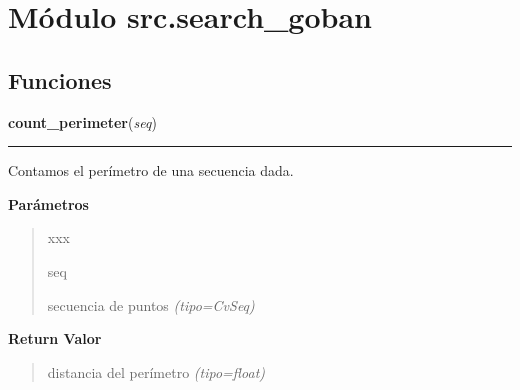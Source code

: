 %
%
%


\section{Módulo src.search\_goban}

    \label{src:search_goban}


  \subsection{Funciones}

    \label{src:search_goban:count_perimeter}

    \vspace{0.5ex}

\hspace{.8\funcindent}\begin{boxedminipage}{\funcwidth}

    \raggedright \textbf{count\_perimeter}(\textit{seq})

    \vspace{-1.5ex}

    \rule{\textwidth}{0.5\fboxrule}
\setlength{\parskip}{2ex}
Contamos el perímetro de una secuencia dada.

\setlength{\parskip}{1ex}
      \textbf{Parámetros}
      \vspace{-1ex}

      \begin{quote}
        \begin{Ventry}{xxx}

          \item[seq]


secuencia de puntos
            {\it (tipo=CvSeq)}

        \end{Ventry}

      \end{quote}

      \textbf{Return Valor}
    \vspace{-1ex}

      \begin{quote}

distancia del perímetro
      {\it (tipo=float)}

      \end{quote}

    \end{boxedminipage}

